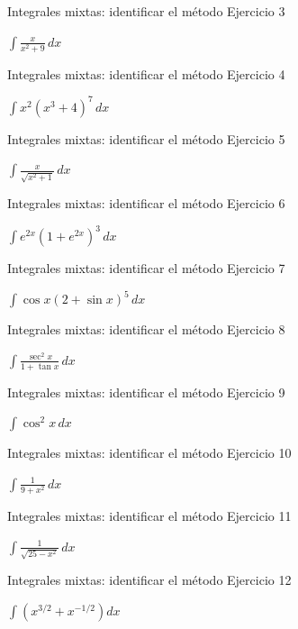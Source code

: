 \documentclass[10pt,aspectratio=169]{beamer}
\newcommand{\ejercicio}[1]{%
  \begin{center}
  \vfill
  {\fontsize{24}{30}\selectfont #1}
  \vfill
  \end{center}
}
\begin{document}
\begin{frame}{Integrales mixtas: identificar el método}
\small Ejercicio 3
\ejercicio{$\displaystyle \int\frac{x}{x^2+9}\,dx$}
\end{frame}

\begin{frame}{Integrales mixtas: identificar el método}
\small Ejercicio 4
\ejercicio{$\displaystyle \int x^2(x^3+4)^7\,dx$}
\end{frame}

\begin{frame}{Integrales mixtas: identificar el método}
\small Ejercicio 5
\ejercicio{$\displaystyle \int\frac{x}{\sqrt{x^2+1}}\,dx$}
\end{frame}

\begin{frame}{Integrales mixtas: identificar el método}
\small Ejercicio 6
\ejercicio{$\displaystyle \int e^{2x}(1+e^{2x})^3\,dx$}
\end{frame}

\begin{frame}{Integrales mixtas: identificar el método}
\small Ejercicio 7
\ejercicio{$\displaystyle \int\cos x(2+\sin x)^5\,dx$}
\end{frame}

\begin{frame}{Integrales mixtas: identificar el método}
\small Ejercicio 8
\ejercicio{$\displaystyle \int\frac{\sec^2x}{1+\tan x}\,dx$}
\end{frame}

\begin{frame}{Integrales mixtas: identificar el método}
\small Ejercicio 9
\ejercicio{$\displaystyle \int\cos^2x\,dx$}
\end{frame}

\begin{frame}{Integrales mixtas: identificar el método}
\small Ejercicio 10
\ejercicio{$\displaystyle \int\frac{1}{9+x^2}\,dx$}
\end{frame}

\begin{frame}{Integrales mixtas: identificar el método}
\small Ejercicio 11
\ejercicio{$\displaystyle \int\frac{1}{\sqrt{25-x^2}}\,dx$}
\end{frame}

\begin{frame}{Integrales mixtas: identificar el método}
\small Ejercicio 12
\ejercicio{$\displaystyle \int\left(x^{3/2}+x^{-1/2}\right)dx$}
\end{frame}
\end{document}
